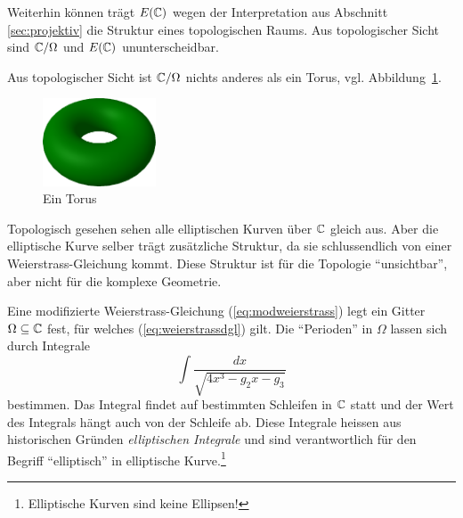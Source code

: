 Weiterhin können trägt $E({\mathbb{C}})$ wegen der Interpretation aus Abschnitt
\ref{sec:projektiv} die Struktur eines topologischen Raums.
Aus
topologischer Sicht sind ${\mathbb{C}}/\Omega$ und $E({\mathbb{C}})$ ununterscheidbar.

\begin{bemerkung}
  Aus topologischer Sicht ist ${\mathbb{C}}/\Omega$ nichts anderes als ein
  Torus, vgl. Abbildung~\ref{fig:torus}.
    \begin{figure}
      \centering
      \caption{Ein Torus}
    \label{fig:torus}
    \includegraphics[width=0.3\textwidth]{./plots/torus.png}
  \end{figure}
  Topologisch gesehen sehen alle elliptischen Kurven über ${\mathbb{C}}$ gleich
  aus. Aber die elliptische Kurve selber trägt zusätzliche Struktur,
  da sie schlussendlich von einer Weierstrass-Gleichung kommt. Diese
  Struktur ist für die Topologie ``unsichtbar'', aber nicht für die
  komplexe Geometrie. 
\end{bemerkung}

Eine modifizierte Weierstrass-Gleichung (\ref{eq:modweierstrass}) legt
ein Gitter $\Omega\subseteq{\mathbb{C}}$ fest, für welches
(\ref{eq:weierstrassdgl}) gilt.  Die ``Perioden'' in $\Omega$ lassen
sich durch  Integrale
\begin{equation*}
  \int \frac{dx}{\sqrt{4x^3-g_2 x - g_3}}
\end{equation*}
bestimmen. Das Integral findet auf bestimmten Schleifen  in ${\mathbb{C}}$ statt
und der Wert des Integrals hängt auch von der Schleife ab.  Diese
Integrale heissen aus historischen Gründen \emph{elliptischen
  Integrale} und sind verantwortlich für den Begriff ``elliptisch'' in
elliptische Kurve.\footnote{Elliptische Kurven sind keine Ellipsen!}


